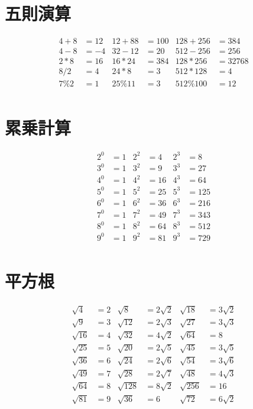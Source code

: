 \documentclass[paper=b4j,landscape,twocolumn,fleqn]{jlreq}
\begin{document}
\section{五則演算}
\begin{align*}
  4+8&=12 & 12+88&=100 & 128+256&=384\\
  4-8&=-4 & 32-12&=20 & 512-256&=256\\
  2*8&=16 & 16*24&=384 & 128*256&=32768\\
  8/2&=4 & 24*8&=3 & 512*128&=4\\
  7\%2&=1 & 25\%11&=3 & 512\%100&=12\\
\end{align*}
\section{累乗計算}
\begin{align*}
  2^0&=1 & 2^2&=4 & 2^3&=8\\
  3^0&=1 & 3^2&=9 & 3^3&=27\\
  4^0&=1 & 4^2&=16 & 4^3&=64\\
  5^0&=1 & 5^2&=25 & 5^3&=125\\
  6^0&=1 & 6^2&=36 & 6^3&=216\\
  7^0&=1 & 7^2&=49 & 7^3&=343\\
  8^0&=1 & 8^2&=64 & 8^3&=512\\
  9^0&=1 & 9^2&=81 & 9^3&=729\\
\end{align*}
\section{平方根}
\begin{align*}
  \sqrt{4}&=2 & \sqrt{8}&=2\sqrt{2} & \sqrt{18}&=3\sqrt{2}\\
  \sqrt{9}&=3 & \sqrt{12}&=2\sqrt{3} & \sqrt{27}&=3\sqrt{3}\\
  \sqrt{16}&=4 & \sqrt{32}&=4\sqrt{2} & \sqrt{64}&=8 \\
  \sqrt{25}&=5 & \sqrt{20}&=2\sqrt{5} & \sqrt{45}&=3\sqrt{5}\\
  \sqrt{36}&=6 & \sqrt{24}&=2\sqrt{6} & \sqrt{54}&=3\sqrt{6}\\
  \sqrt{49}&=7 & \sqrt{28}&=2\sqrt{7} & \sqrt{48}&=4\sqrt{3}\\
  \sqrt{64}&=8 & \sqrt{128}&=8\sqrt{2} & \sqrt{256}&=16\\
  \sqrt{81}&=9 & \sqrt{36}&=6 & \sqrt{72}&=6\sqrt{2}\\
\end{align*}
\end{document}
